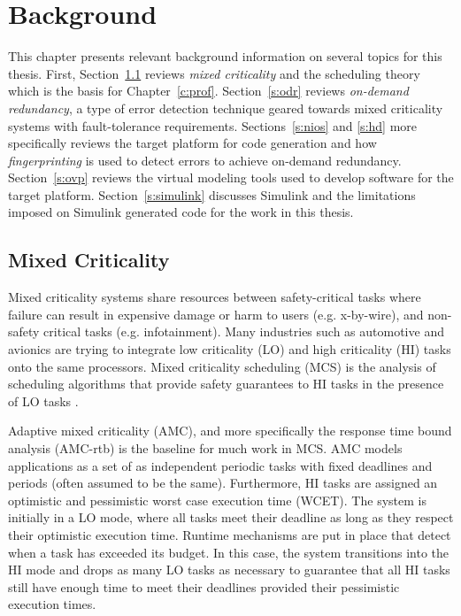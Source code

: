 
\chapter{Background} %

\label{c:background} %


	This chapter presents relevant background information on several topics for this thesis. 
	First, Section~\ref{s:mixedcriticality} reviews \emph{mixed criticality} and the scheduling theory which is the basis for Chapter~\ref{c:prof}. 
	Section~\ref{s:odr} reviews \emph{on-demand redundancy}, a type of error detection technique geared towards mixed criticality systems with fault-tolerance requirements. 
	Sections~\ref{s:nios} and \ref{s:hd} more specifically reviews the target platform for code generation and how \emph{fingerprinting} is used to detect errors to achieve on-demand redundancy.
	Section~\ref{s:ovp} reviews the virtual modeling tools used to develop software for the target platform.
	Section~\ref{s:simulink} discusses Simulink and the limitations imposed on Simulink generated code for the work in this thesis.
	

\section{Mixed Criticality}
\label{s:mixedcriticality}
	Mixed criticality systems share resources between safety-critical tasks where failure can result in expensive damage or harm to users (e.g. x-by-wire), and non-safety critical tasks (e.g. infotainment). 
	Many industries such as automotive and avionics are trying to integrate low criticality (LO) and high criticality (HI) tasks onto the same processors.
	Mixed criticality scheduling (MCS) is the analysis of scheduling algorithms that provide safety guarantees to HI tasks in the presence of LO tasks \cite{burns2013mixed}.
	
	Adaptive mixed criticality (AMC), and more specifically the response time bound analysis (AMC-rtb) \cite{baruah2011response} is the baseline for much work in MCS. 
	AMC models applications as a set of as independent periodic tasks with fixed deadlines and periods (often assumed to be the same).
	Furthermore, HI tasks are assigned an optimistic and pessimistic worst case execution time (WCET). 
	The system is initially in a LO mode, where all tasks meet their deadline as long as they respect their optimistic execution time.
	Runtime mechanisms are put in place that detect when a task has exceeded its budget.
	In this case, the system transitions into the HI mode and drops as many LO tasks as necessary to guarantee that all HI tasks still have enough time to meet their deadlines provided their pessimistic execution times. 
	
